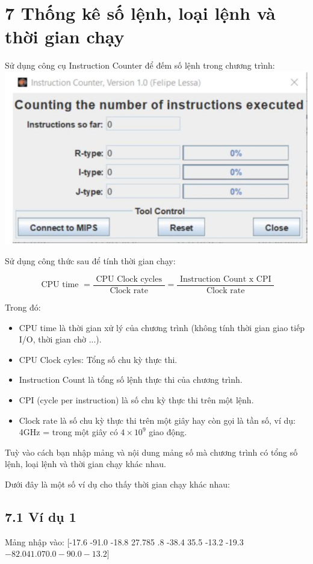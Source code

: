 \documentclass[a4paper]{article}
\begin{document}
\section*{7 Thống kê số lệnh, loại lệnh và thời gian chạy}
Sử dụng công cụ Instruction Counter để đếm số lệnh trong chương trình:
\includegraphics[max width=\textwidth, center]{2023_12_26_b6dd10aae82b8bc52f5bg-4}

Sử dụng công thức sau để tính thời gian chạy:

$$
\text { CPU time }=\frac{\text { CPU Clock cycles }}{\text { Clock rate }}=\frac{\text { Instruction Count } \mathrm{x} \text { CPI }}{\text { Clock rate }}
$$

Trong đó:

\begin{itemize}
  \item CPU time là thời gian xử lý của chương trình (không tính thời gian giao tiếp I/O, thời gian chờ ...).
  \item CPU Clock cyles: Tổng số chu kỳ thực thi.
  \item Instruction Count là tổng số lệnh thực thi của chương trình.
  \item CPI (cycle per instruction) là số chu kỳ thực thi trên một lệnh.
  \item Clock rate là số chu kỳ thực thi trên một giây hay còn gọi là tần số, ví dụ: 4GHz = trong một giây có $4 \times 10^{9}$ giao động.
\end{itemize}

Tuỳ vào cách bạn nhập mảng và nội dung mảng số mà chương trình có tổng số lệnh, loại lệnh và thời gian chạy khác nhau.

Dưới đây là một số ví dụ cho thấy thời gian chạy khác nhau:

\subsection*{7.1 Ví dụ 1}
Mảng nhập vào: [-17.6 -91.0 -18.8 27.785 .8 -38.4 35.5 -13.2 -19.3 $-82.041 .070 .0-90.0-13.2]$
\end{document}
